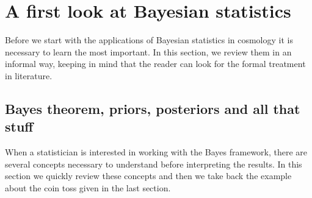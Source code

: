 \documentclass[onecolumn,           %
               showpacs,            %
               preprintnumbers,     %
               aps,                 %
               letterpaper,             %
               superscriptaddress,      %
               nofootinbib,         %
               tightenlines,        %
               floats,floatfix      %
               ,usenatbib,
               ]{revtex4-1}
\begin{document}

\section{A first look at Bayesian statistics}

Before we start with the applications of Bayesian statistics in cosmology it is necessary to learn the most important. In this section, we review them in an informal way, keeping in mind that the reader can look for the formal treatment in literature.   

\subsection{Bayes theorem, priors, posteriors and all that stuff}\label{BTPP}

When a statistician is interested in working with the Bayes framework, there are several concepts necessary to understand before interpreting the results. In this section we quickly review these concepts and then we take back the example about the coin toss given in the last section. 
\end{document}
